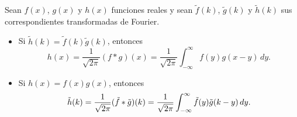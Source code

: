\newpage

\begin{teorema}
Sean $f(x)$, $g(x)$ y $h(x)$  funciones reales y sean $\tilde{f}(k)$, $\tilde{g}(k)$ y $\tilde{h}(k)$ sus correspondientes transformadas de Fourier. 

\begin{itemize}
    \item Si $\tilde{h}(k) = \tilde{f}(k) \tilde{g}(k)$, entonces 
$$ h(x) = \frac{1}{\sqrt{2\pi}} (f * g)(x) = \frac{1}{\sqrt{2\pi}} \int_{-\infty}^{\infty} f(y) g(x-y) \,dy.$$ 

    \item Si $h(x) = f(x) g(x)$, entonces
    \begin{equation}
        \Tilde{h}(k) = \frac{1}{\sqrt{2\pi}}(\Tilde{f} * \Tilde{g})(k) = \frac{1}{\sqrt{2\pi}} \int_{-\infty}^{\infty} \Tilde{f}(y) \Tilde{g}(k-y) \,dy.
    \end{equation}
\end{itemize}
\end{teorema}

